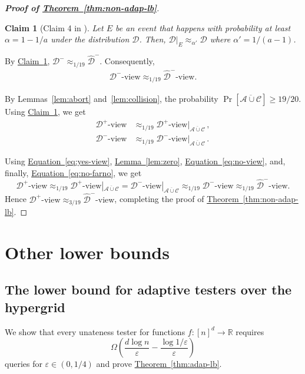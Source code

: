 \documentclass[11pt]{article}
\numberwithin{equation}{section}
\newtheorem{claim}[theorem]{Claim}
\theoremstyle{definition}
\theoremstyle{plain}
\newcommand{\R}{\mathbb R}
\newcommand{\expref}[2]{\hyperref[#2]{#1~\ref{#2}}}
\newcommand{\expeqref}[2]{\hyperref[#2]{#1~\eqref{#2}}}
\newcommand{\eps}{\varepsilon}
\newcommand{\cA}{\ensuremath{\mathcal{A}}}
\newcommand{\cC}{\ensuremath{\mathcal{C}}}
\newcommand{\cD}{\ensuremath{\mathcal{D}}}
\newcommand{\Yes}{\ensuremath{\mathcal{D}^+}}
\newcommand{\No}{\ensuremath{\mathcal{D}^-}}
\newcommand{\FarNo}{\ensuremath{\widehat{\mathcal{D}}^-}}
\newcommand{\Thm}[1]{\expref{Theorem}{thm:#1}}
\newcommand{\Lem}[1]{\expref{Lemma}{lem:#1}}
\newcommand{\Clm}[1]{\expref{Claim}{clm:#1}}
\begin{document}
\begin{proof}[{\bf Proof of \Thm{non-adap-lb}}]
\begin{claim}[Claim 4 in \cite{RS06}]\label{clm:sd-prob}
Let $E$ be an event that happens with probability at least $\alpha = 1 - 1/a$ under the distribution $\cD$.
Then, $\cD|_{E} \approx_{\alpha'} \cD$ where $\alpha' = 1/(a-1)$.
\end{claim}

%
By \Clm{sd-prob},    %
$\No \approx_{1/19} \FarNo$. Consequently,
\begin{align}
\No\text{-view} \approx_{1/19} \FarNo\text{-view}. \label{eq:no-farno}
\end{align}

By Lemmas~\ref{lem:abort} and~\ref{lem:collision}, the probability $\Pr[\overline{\cA \cup \cC}] \geq 19/20$. Using
%
\Clm{sd-prob}, we get   %
%
\begin{align}
\Yes\text{-view} &\approx_{1/19} \Yes\text{-view}|_{\overline{\cA \cup \cC}}\,, \label{eq:yes-view}\\
\No\text{-view} &\approx_{1/19} \No\text{-view}|_{\overline{\cA \cup \cC}}\,. \label{eq:no-view}
\end{align}
%

Using  \expeqref{Equation}{eq:yes-view}, \Lem{zero}, \expeqref{Equation}{eq:no-view}, and, finally, \expeqref{Equation}{eq:no-farno}, we get
\[\Yes\text{-view} \approx_{1/19} \Yes\text{-view}|_{\overline{\cA \cup \cC}} =  \No\text{-view}|_{\overline{\cA \cup \cC}} \approx_{1/19} \No\text{-view} \approx_{1/19} \FarNo\text{-view}.\]
Hence $\Yes\text{-view} \approx_{3/19} \FarNo\text{-view}$, completing the proof of \Thm{non-adap-lb}.
\end{proof}


\section{Other lower bounds}
\subsection{The lower bound for adaptive testers over the hypergrid} \label{sec:adap-lb}
We show that every unateness tester for functions $f:[n]^d \to \R$  requires
\[
  \Omega\left(\frac{d \log n}{\eps}-\frac{\log 1/\eps}{\eps}\right)
\]
queries for $\eps\in(0,1/4)$ and prove \Thm{adap-lb}.
\end{document}
